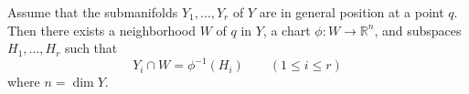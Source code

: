 Assume that the submanifolds $Y_1, \ldots, Y_r$ of $Y$ are in general position at a point $q$. Then there exists a neighborhood $W$ of $q$ in $Y$, a chart $\phi: W \to \mathbb{R}^n$, and subspaces $H_1, \ldots, H_r$ such that
$$Y_i \cap W = \phi^{-1}(H_i) \qquad (1 \leq i \leq r)$$
where $n = \dim Y$.
